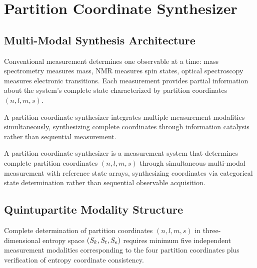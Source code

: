 \section{Partition Coordinate Synthesizer}
\label{sec:synthesizer}

\subsection{Multi-Modal Synthesis Architecture}

Conventional measurement determines one observable at a time: mass spectrometry measures mass, NMR measures spin states, optical spectroscopy measures electronic transitions. Each measurement provides partial information about the system's complete state characterized by partition coordinates $(n, l, m, s)$.

A partition coordinate synthesizer integrates multiple measurement modalities simultaneously, synthesizing complete coordinates through information catalysis rather than sequential measurement.

\begin{definition}
\label{def:synthesizer}
A partition coordinate synthesizer is a measurement system that determines complete partition coordinates $(n, l, m, s)$ through simultaneous multi-modal measurement with reference state arrays, synthesizing coordinates via categorical state determination rather than sequential observable acquisition.
\end{definition}

\subsection{Quintupartite Modality Structure}

\begin{theorem}
\label{thm:quintupartite}
Complete determination of partition coordinates $(n, l, m, s)$ in three-dimensional entropy space $(S_k, S_t, S_e)$ requires minimum five independent measurement modalities corresponding to the four partition coordinates plus verification of entropy coordinate consistency.
\end{theorem}

